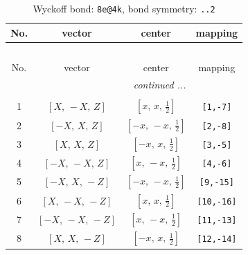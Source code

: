 \documentclass[fleqn,8pt]{jsarticle}
\begin{document}
\begin{longtable}{cccc}
\caption{Wyckoff bond: {\tt 8e@4k}, bond symmetry: {\tt ..2}}
 \\
 \hline \hline
No. & vector & center & mapping \\ \hline \endfirsthead

\multicolumn{3}{l}{\tablename\ \thetable{}} \\
 \hline \hline
No. & vector & center & mapping \\ \hline \endhead

 \hline \hline
\multicolumn{3}{r}{\footnotesize\it continued ...} \\ \endfoot

 \hline \hline
\multicolumn{3}{r}{} \\ \endlastfoot

1 & $\left[ X,\, - X,\, Z \right]$ & $\left[ x,\, x,\, \frac{1}{2} \right]$ & {\tt [1,-7]} \\ \hline
2 & $\left[ - X,\, X,\, Z \right]$ & $\left[ - x,\, - x,\, \frac{1}{2} \right]$ & {\tt [2,-8]} \\ \hline
3 & $\left[ X,\, X,\, Z \right]$ & $\left[ - x,\, x,\, \frac{1}{2} \right]$ & {\tt [3,-5]} \\ \hline
4 & $\left[ - X,\, - X,\, Z \right]$ & $\left[ x,\, - x,\, \frac{1}{2} \right]$ & {\tt [4,-6]} \\ \hline
5 & $\left[ - X,\, X,\, - Z \right]$ & $\left[ - x,\, - x,\, \frac{1}{2} \right]$ & {\tt [9,-15]} \\ \hline
6 & $\left[ X,\, - X,\, - Z \right]$ & $\left[ x,\, x,\, \frac{1}{2} \right]$ & {\tt [10,-16]} \\ \hline
7 & $\left[ - X,\, - X,\, - Z \right]$ & $\left[ x,\, - x,\, \frac{1}{2} \right]$ & {\tt [11,-13]} \\ \hline
8 & $\left[ X,\, X,\, - Z \right]$ & $\left[ - x,\, x,\, \frac{1}{2} \right]$ & {\tt [12,-14]} \\
\end{longtable}
\renewcommand{\arraystretch}{1.2}
\end{document}
